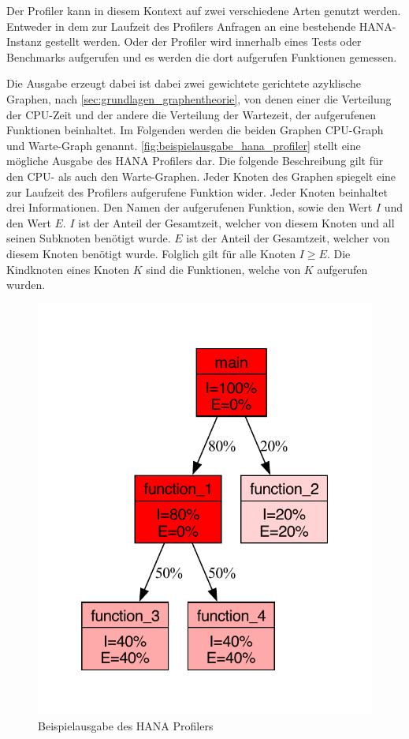 Der Profiler kann in diesem Kontext auf zwei verschiedene Arten genutzt werden.
Entweder in dem zur Laufzeit des Profilers Anfragen an eine bestehende
HANA-Instanz gestellt werden. Oder der Profiler wird innerhalb eines Tests oder
Benchmarks aufgerufen und es werden die dort aufgerufen Funktionen gemessen.

Die Ausgabe erzeugt dabei ist dabei zwei gewichtete gerichtete azyklische
Graphen, nach \autoref{sec:grundlagen_graphentheorie}, von denen einer die Verteilung der CPU-Zeit und der andere die
Verteilung der Wartezeit, der aufgerufenen Funktionen beinhaltet. Im Folgenden
werden die beiden Graphen CPU-Graph und Warte-Graph genannt.
\autoref{fig:beispielausgabe_hana_profiler} stellt eine mögliche Ausgabe des
HANA Profilers dar. Die folgende Beschreibung gilt für den CPU- als auch den
Warte-Graphen. Jeder Knoten des Graphen spiegelt eine zur Laufzeit des
Profilers aufgerufene Funktion wider. Jeder Knoten beinhaltet drei
Informationen. Den Namen der aufgerufenen Funktion, sowie den Wert $I$ und den
Wert $E$. $I$ ist der Anteil der Gesamtzeit, welcher von diesem Knoten und all
seinen Subknoten benötigt wurde. $E$ ist der Anteil der Gesamtzeit, welcher
von diesem Knoten benötigt wurde. Folglich gilt für alle Knoten $I\geq E$.
Die Kindknoten eines Knoten $K$ sind die Funktionen, welche von $K$ aufgerufen
wurden.

\begin{figure}[h]
    \begin{center}
        \includegraphics[page=1]{Bilder/pdf/profiler_output_example.pdf}
    \end{center}
    \caption{Beispielausgabe des HANA Profilers}\label{fig:beispielausgabe_hana_profiler}
\end{figure}

